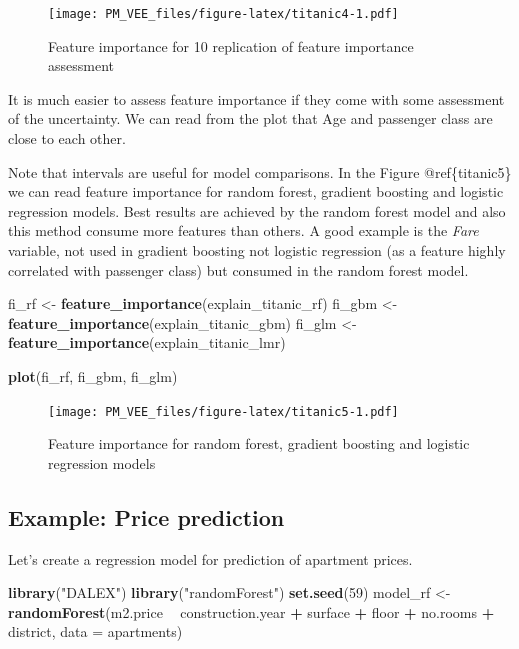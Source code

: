\documentclass[12pt,]{krantz}
\newenvironment{Shaded}{\begin{snugshade}}{\end{snugshade}}
\newcommand{\DataTypeTok}[1]{\textcolor[rgb]{0.13,0.29,0.53}{#1}}
\newcommand{\DecValTok}[1]{\textcolor[rgb]{0.00,0.00,0.81}{#1}}
\newcommand{\KeywordTok}[1]{\textcolor[rgb]{0.13,0.29,0.53}{\textbf{#1}}}
\newcommand{\NormalTok}[1]{#1}
\newcommand{\OperatorTok}[1]{\textcolor[rgb]{0.81,0.36,0.00}{\textbf{#1}}}
\newcommand{\StringTok}[1]{\textcolor[rgb]{0.31,0.60,0.02}{#1}}
\theoremstyle{definition}
\theoremstyle{definition}
\theoremstyle{definition}
\theoremstyle{remark}
\begin{document}
\begin{figure}
\centering
\texttt{[image: PM\_VEE\_files/figure-latex/titanic4-1.pdf]}
\caption{\label{fig:titanic4}Feature importance for 10 replication of
feature importance assessment}
\end{figure}

It is much easier to assess feature importance if they come with some
assessment of the uncertainty. We can read from the plot that Age and
passenger class are close to each other.

Note that intervals are useful for model comparisons. In the Figure
@ref\{titanic5\} we can read feature importance for random forest,
gradient boosting and logistic regression models. Best results are
achieved by the random forest model and also this method consume more
features than others. A good example is the \emph{Fare} variable, not
used in gradient boosting not logistic regression (as a feature highly
correlated with passenger class) but consumed in the random forest
model.

\begin{Shaded}
\begin{Highlighting}[]
\NormalTok{fi_rf <-}\StringTok{ }\KeywordTok{feature_importance}\NormalTok{(explain_titanic_rf)}
\NormalTok{fi_gbm <-}\StringTok{ }\KeywordTok{feature_importance}\NormalTok{(explain_titanic_gbm)}
\NormalTok{fi_glm <-}\StringTok{ }\KeywordTok{feature_importance}\NormalTok{(explain_titanic_lmr)}

\KeywordTok{plot}\NormalTok{(fi_rf, fi_gbm, fi_glm)}
\end{Highlighting}
\end{Shaded}

\begin{figure}
\centering
\texttt{[image: PM\_VEE\_files/figure-latex/titanic5-1.pdf]}
\caption{\label{fig:titanic5}Feature importance for random forest, gradient
boosting and logistic regression models}
\end{figure}

\hypertarget{example-price-prediction}{%
\subsection{Example: Price prediction}\label{example-price-prediction}}

Let's create a regression model for prediction of apartment prices.

\begin{Shaded}
\begin{Highlighting}[]
\KeywordTok{library}\NormalTok{(}\StringTok{"DALEX"}\NormalTok{)}
\KeywordTok{library}\NormalTok{(}\StringTok{"randomForest"}\NormalTok{)}
\KeywordTok{set.seed}\NormalTok{(}\DecValTok{59}\NormalTok{)}
\NormalTok{model_rf <-}\StringTok{ }\KeywordTok{randomForest}\NormalTok{(m2.price }\OperatorTok{~}\StringTok{ }\NormalTok{construction.year }\OperatorTok{+}\StringTok{ }\NormalTok{surface }\OperatorTok{+}\StringTok{ }\NormalTok{floor }\OperatorTok{+}\StringTok{ }
\StringTok{                           }\NormalTok{no.rooms }\OperatorTok{+}\StringTok{ }\NormalTok{district, }\DataTypeTok{data =}\NormalTok{ apartments)}
\end{Highlighting}
\end{Shaded}
\end{document}
